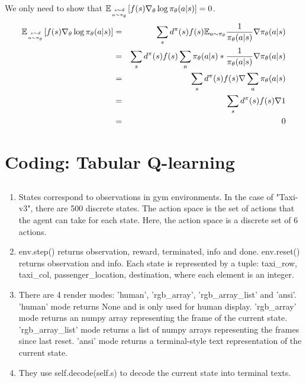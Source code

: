 \documentclass[12pt]{article}
\begin{document}
\subsection{}
We only need to show that $\mathbb{E}_{s \sim d \atop a \sim \pi_{\theta}} [f(s) \nabla_\theta \log \pi_{\theta}(a | s)] = 0 $.
\begin{eqnarray}
    \mathbb{E}_{s \sim d \atop a \sim \pi_{\theta}} [f(s) \nabla_\theta \log \pi_{\theta}(a | s)] &=& \sum_{s} d^\pi(s) f(s) \mathbb{E}_{a \sim \pi_\theta} \frac{1}{\pi_{\theta}(a | s)}\nabla \pi_\theta (a|s) \nonumber \\
    &=& \sum_{s} d^\pi(s) f(s) \sum_{a} \pi_{\theta}(a | s) * \frac{1}{\pi_{\theta}(a | s)} \nabla \pi_{\theta}(a | s) \nonumber \\
    &=& \sum_{s} d^\pi(s) f(s) \nabla \sum_{a} \pi_{\theta}(a | s) \nonumber \\
    &=& \sum_{s} d^\pi(s) f(s) \nabla 1 \nonumber \\
    &=& 0 \nonumber
\end{eqnarray}


\newpage

\section{Coding: Tabular Q-learning}
\subsection{}
\begin{enumerate}
    \item States correspond to observations in gym environments. In the case of "Taxi-v3", there are 500 discrete states. The action space is the set of actions that the agent can take for each state. Here, the action space is a discrete set of 6 actions.
    \item env.step() returns observation, reward, terminated, info and done. env.reset() returns observation and info. Each state is represented by a tuple: taxi\_row, taxi\_col, passenger\_location, destination, where each element is an integer.
    \item There are 4 render modes: 'human', 'rgb\_array', 'rgb\_array\_list' and 'ansi'. 'human' mode returns None and is only used for human display. 'rgb\_array' mode returns an numpy array representing the frame of the current state. 'rgb\_array\_list' mode returns a list of numpy arrays representing the frames since last reset. 'ansi' mode returns a terminal-style text representation of the current state.
    \item They use self.decode(self.s) to decode the current state into terminal texts. 
\end{enumerate}
\end{document}
